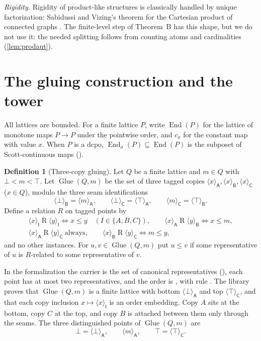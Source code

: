 \documentclass[11pt]{amsart}
\theoremstyle{plain}
\theoremstyle{definition}
\newtheorem{definition}[theorem]{Definition}
\newcommand{\End}{\operatorname{End}}
\newcommand{\SEnd}{\operatorname{End}_\sigma}
\newcommand{\Glue}{\operatorname{Glue}}
\newcommand{\cst}[1]{c_{#1}}
\newcommand{\tg}[2]{\langle #1\rangle_{\mathsf{#2}}}
\begin{document}
\emph{Rigidity.} Rigidity of product-like structures is classically handled by
unique factorization: Sabidussi and Vizing's theorem for the Cartesian product of
connected graphs \cite{Sabidussi1960,Vizing1963}. The finite-level step of
Theorem~B has this shape, but we do not use it: the needed splitting follows from
counting atoms and cardinalities (\cref{lem:prodaut}).

\section{The gluing construction and the tower}\label{sec:glue}

All lattices are bounded. For a finite lattice $P$, write $\End(P)$ for the
lattice of monotone maps $P\to P$ under the pointwise order, and $\cst x$ for
the constant map with value $x$. When $P$ is a dcpo, $\SEnd(P)\subseteq\End(P)$
is the subposet of Scott-continuous maps ().

\begin{definition}[Three-copy gluing]\label{def:glue}
Let $Q$ be a finite lattice and $m\in Q$ with $\bot<m<\top$. Let $\Glue(Q,m)$ be
the set of three tagged copies $\tg{x}{A},\tg{x}{B},\tg{x}{C}$ ($x\in Q$),
modulo the three seam identifications
\[
  \tg{\bot}{B}=\tg{m}{A},\qquad \tg{\bot}{C}=\tg{\top}{A},\qquad \tg{m}{C}=\tg{\top}{B}.
\]
Define a relation $R$ on tagged points by
\begin{gather*}
  \tg xI\mathrel R\tg yI \iff x\le y\quad(I\in\{A,B,C\}),\qquad
  \tg xA\mathrel R\tg yB\iff x\le m,\\
  \tg xA\mathrel R\tg yC\ \text{always},\qquad
  \tg xB\mathrel R\tg yC\iff m\le y,
\end{gather*}
and no other instances. For $u,v\in\Glue(Q,m)$ put $u\le v$ if some
representative of $u$ is $R$-related to some representative of $v$.
\end{definition}

In the formalization the carrier is the set of canonical representatives
(), each point has at most two
representatives, and the order is , with rule
. The library proves that $\Glue(Q,m)$ is a
finite lattice with bottom $\tg\bot A$ and top $\tg\top C$, and that each copy
inclusion $x\mapsto\tg xI$ is an order embedding. Copy $A$ sits at the bottom,
copy $C$ at the top, and copy $B$ is attached between them only through the
seams. The three distinguished points of $\Glue(Q,m)$ are
\[
  \bot=\tg\bot A,\qquad \tg mA,\qquad \top=\tg\top C .
\]
\end{document}
